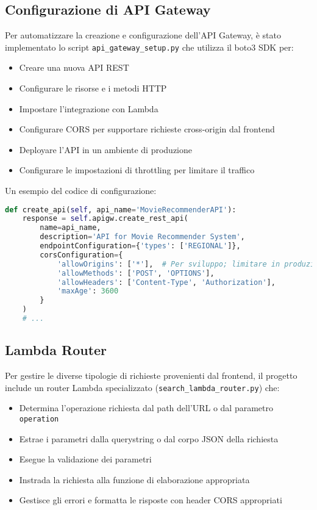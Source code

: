 \documentclass[11pt,a4paper]{article}
\begin{document}
\subsection{Configurazione di API Gateway}
Per automatizzare la creazione e configurazione dell'API Gateway, è stato implementato lo script \texttt{api\_gateway\_setup.py} che utilizza il boto3 SDK per:

\begin{itemize}
  \item Creare una nuova API REST
  \item Configurare le risorse e i metodi HTTP
  \item Impostare l'integrazione con Lambda
  \item Configurare CORS per supportare richieste cross-origin dal frontend
  \item Deployare l'API in un ambiente di produzione
  \item Configurare le impostazioni di throttling per limitare il traffico
\end{itemize}

Un esempio del codice di configurazione:

\begin{lstlisting}[language=Python]
def create_api(self, api_name='MovieRecommenderAPI'):
    response = self.apigw.create_rest_api(
        name=api_name,
        description='API for Movie Recommender System',
        endpointConfiguration={'types': ['REGIONAL']},
        corsConfiguration={
            'allowOrigins': ['*'],  # Per sviluppo; limitare in produzione
            'allowMethods': ['POST', 'OPTIONS'],
            'allowHeaders': ['Content-Type', 'Authorization'],
            'maxAge': 3600
        }
    )
    # ...
\end{lstlisting}

\subsection{Lambda Router}
Per gestire le diverse tipologie di richieste provenienti dal frontend, il progetto include un router Lambda specializzato (\texttt{search\_lambda\_router.py}) che:

\begin{itemize}
  \item Determina l'operazione richiesta dal path dell'URL o dal parametro \texttt{operation}
  \item Estrae i parametri dalla querystring o dal corpo JSON della richiesta
  \item Esegue la validazione dei parametri
  \item Instrada la richiesta alla funzione di elaborazione appropriata
  \item Gestisce gli errori e formatta le risposte con header CORS appropriati
\end{itemize}
\end{document}

